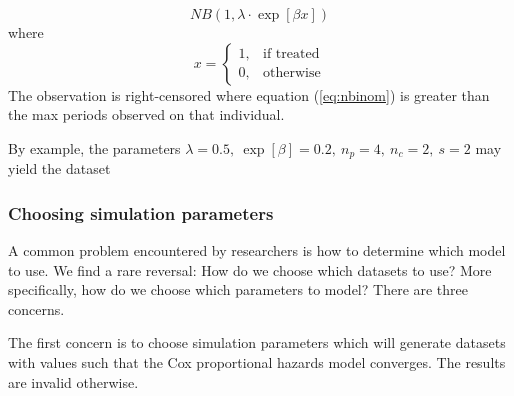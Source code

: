 
%
\begin{equation}
\label{eq:nbinom}
NB(1, \lambda \cdot \exp[\beta x])
\end{equation}
%
where
%
$$
  x=\begin{cases}
    1, & \text{if treated}\\
    0, & \text{otherwise}
  \end{cases}
$$
%
The observation is right-censored where equation (\ref{eq:nbinom}) is greater than the max periods observed on that individual.

By example, the parameters $\lambda=0.5, ~\exp[\beta]=0.2, ~n_p=4, ~n_c=2, ~s=2$ may yield the dataset


\pgfplotsset{compat=newest}
\mytable
\pgfplotstabletypeset[fixed, %
precision=1, %
dec sep align %
]{\mytable}

\subsubsection{Choosing simulation parameters}
\label{sec:sim-params}
A common problem encountered by researchers is how to determine which model to use. We find a rare reversal: How do we choose which datasets to use? More specifically, how do we choose which parameters to model? There are three concerns.

The first concern is to choose simulation parameters which will generate datasets with values such that the Cox proportional hazards model converges. The results are invalid otherwise. 

